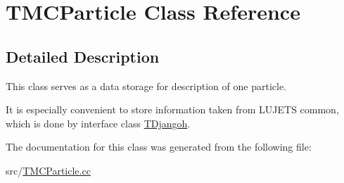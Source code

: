\hypertarget{class_t_m_c_particle}{}\section{T\+M\+C\+Particle Class Reference}
\label{class_t_m_c_particle}


\subsection{Detailed Description}
This class serves as a data storage for description of one particle.

It is especially convenient to store information taken from L\+U\+J\+E\+TS common, which is done by interface class \hyperlink{class_t_djangoh}{T\+Djangoh}. 

The documentation for this class was generated from the following file\+:\begin{DoxyCompactItemize}
\item 
src/\hyperlink{_t_m_c_particle_8cc}{T\+M\+C\+Particle.\+cc}\end{DoxyCompactItemize}
